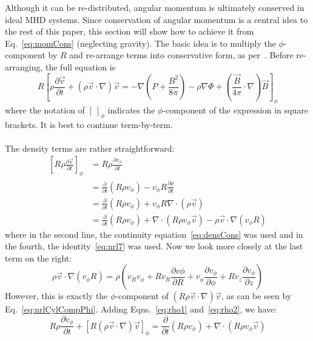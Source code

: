 Although it can be re-distributed, angular momentum is ultimately conserved in ideal MHD systems. Since conservation of angular momentum is a central idea to the rest of this paper, this section will show how to achieve it from Eq.~\ref{eq:momCons} (neglecting gravity). The basic idea is to multiply the $\phi$-component by $R$ and re-arrange terms into conservative form, as per~\cite{BalbusHawley1998}. Before re-arranging, the full equation is 
\begin{equation}
  R\left[\rho\frac{\partial\vec v}{\partial t}+\left(\rho\vec v\cdot\nabla\right) \vec v =-\nabla\left(P+\frac{B^2}{8\pi}\right)-\rho\nabla\Phi+\left(\frac{\vec B}{4\pi}\cdot\nabla\right)\vec B\right]_\phi
\end{equation}
where the notation of $\left[~\right]_\phi$ indicates the $\phi$-component of the expression in square brackets. It is best to continue term-by-term. \\
\\
The density terms are rather straightforward:
\begin{align}
  \left[R\rho\frac{\partial\vec v}{\partial t}\right]_\phi&=R\rho\frac{\partial v_\phi}{\partial t}\nonumber\\
  &=\frac\partial{\partial t}\left(R\rho v_\phi\right)-v_\phi R\frac{\partial\rho}{\partial t}\nonumber\\
  &=\frac\partial{\partial t}\left(R\rho v_\phi\right)+v_\phi R\nabla\cdot\left(\rho\vec v\right)\nonumber\\
  &=\frac\partial{\partial t}\left(R\rho v_\phi\right)+\nabla\cdot\left(R\rho v_\phi\vec v\right)-\rho\vec v\cdot\nabla\left(v_\phi R\right)\label{eq:rho1}
\end{align}
where in the second line, the continuity equation~\ref{eq:densCons} was used and in the fourth, the identity~\ref{eq:nrl7} was used. Now we look more closely at the last term on the right:
\begin{equation}
  \rho\vec v\cdot\nabla\left(v_\phi R\right)=\rho\left(v_Rv_\phi+Rv_R\frac{\partial v\phi}{\partial R}+v_\phi\frac{\partial v_\phi}{\partial\phi}+Rv_z\frac{\partial v_\phi}{\partial z}\right)\label{eq:rho2}
\end{equation}
However, this is exactly the $\phi$-component of $\left(R\rho\vec v\cdot\nabla\right)\vec v$, as can be seen by Eq.~\ref{eq:nrlCylCompPhi}. Adding Eqns.~\ref{eq:rho1} and~\ref{eq:rho2}, we have:
\begin{equation}
  R\rho\frac{\partial v_\phi}{\partial t}+\left[R\left(\rho\vec v\cdot\nabla\right)\vec v\right]_\phi=\frac\partial{\partial t}\left(R\rho v_\phi\right)+\nabla\cdot\left(R\rho v_\phi\vec v\right)\label{eq:rhoPhiCons}
\end{equation}
